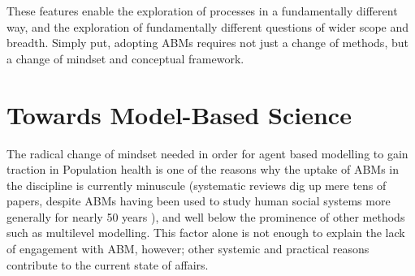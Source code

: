 \documentclass[review]{elsarticle}
\begin{document}



These features enable the exploration of processes in a fundamentally different way, and the exploration of fundamentally different questions of wider scope and breadth. Simply put, adopting ABMs requires not just a change of methods, but a change of mindset and conceptual framework.

\section{Towards Model-Based Science}

The radical change of mindset needed in order for agent based modelling to gain traction in Population health is one of the reasons why the uptake of ABMs in the discipline is currently minuscule (systematic reviews dig up mere tens of papers, despite ABMs having been used to study human social systems more generally for nearly 50 years \citep{nianogo2015}), and well below the prominence of other methods such as multilevel modelling.  This factor alone is not enough to explain the lack of engagement with ABM, however; other systemic and practical reasons contribute to the current state of affairs.
\end{document}
